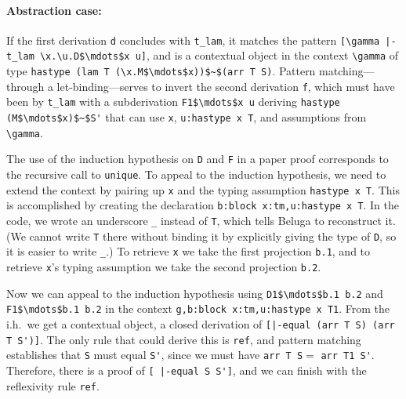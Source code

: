  \paragraph{Abstraction case:}
  If the first derivation \lstinline{d} concludes with \lstinline{t_lam}, it matches
 the pattern \lstinline{[\gamma |-t_lam \x.\u.D$\mdots$x u]}, and is
 a contextual object in the context \lstinline!\gamma! of type 
 \lstinline{hastype (lam T (\x.M$\mdots$x))$~$(arr T S)}.
 Pattern matching---through a let-binding---serves to invert the second derivation \lstinline{f}, which
 must have been by \lstinline{t_lam} with a subderivation
 \lstinline{F1$\mdots$x u} deriving \lstinline{hastype (M$\mdots$x)$~$S'} that can use \lstinline{x},
 \lstinline{u:hastype x T}, and assumptions from \lstinline!\gamma!.

 The use of the induction hypothesis on \lstinline{D} and \lstinline{F} in a paper proof
 corresponds to the recursive call to \lstinline{unique}.  To appeal to the
 induction hypothesis, we need to extend the context by pairing up \lstinline{x} and
 the typing assumption \lstinline!hastype x T!. This is accomplished by creating
 the declaration \lstinline!b:block x:tm,u:hastype x T!.  In the
 code, we wrote an underscore \lstinline!_! instead of \lstinline{T},
 which tells Beluga to reconstruct it.  (We cannot write \lstinline{T} there without binding it by
 explicitly giving the type of \lstinline{D}, so it is easier to write \lstinline!_!.)
 To retrieve \lstinline{x} we take the first projection
 \lstinline{b.1}, and to retrieve \lstinline{x}'s typing assumption we take the second projection \lstinline{b.2}.
 
 Now we can appeal to the induction hypothesis using
 \lstinline!D1$\mdots$b.1 b.2! and \lstinline!F1$\mdots$b.1 b.2! in the context
 \lstinline!g,b:block x:tm,u:hastype x T1!. 
  From the i.h.\ we get a
 contextual object, a closed derivation of
 \lstinline![|-equal (arr T S) (arr T S')]!. The only rule that could
 derive this is \lstinline{ref}, and pattern matching establishes that \lstinline{S}
 must equal \lstinline{S'}, since we must have \lstinline!arr T S!$ =$
\lstinline!arr T1 S'!.  Therefore, there is a proof of
\lstinline![ |-equal S S']!, 
 and we can finish with the reflexivity rule \lstinline{ref}.

